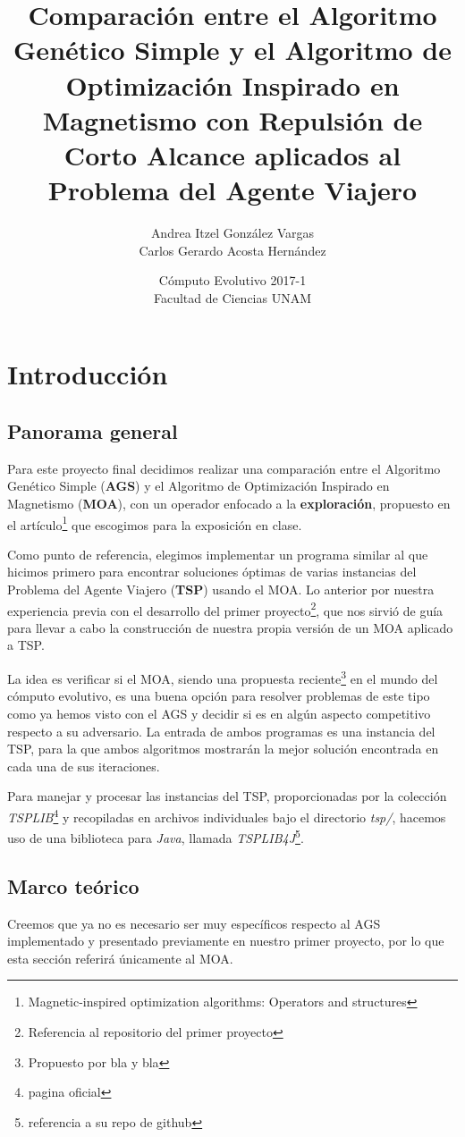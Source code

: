 \documentclass[12pt]{article}
\title{Comparación entre el Algoritmo Genético Simple y el Algoritmo de Optimización Inspirado en Magnetismo con Repulsión de Corto Alcance aplicados al Problema del Agente Viajero}
\author{Andrea Itzel González Vargas \\
  Carlos Gerardo Acosta Hernández}
\date{Cómputo Evolutivo 2017-1 \\ Facultad de Ciencias UNAM \\ }
\begin{document}
\maketitle
\section{Introducción}
\subsection*{Panorama general}
Para este proyecto final decidimos realizar una comparación entre el Algoritmo Genético Simple (\textbf{AGS}) y el Algoritmo de Optimización Inspirado en Magnetismo (\textbf{MOA}),
con un operador enfocado a la \textbf{exploración}, propuesto en el artículo\footnote{Magnetic-inspired optimization algorithms: Operators and structures} que escogimos para la exposición en clase.

Como punto de referencia, elegimos implementar un programa similar al que hicimos primero para encontrar soluciones óptimas de
varias instancias del Problema del Agente Viajero (\textbf{TSP}) usando el MOA. Lo anterior por nuestra experiencia previa con el desarrollo del primer proyecto\footnote{Referencia al repositorio del primer proyecto}, que nos sirvió de guía para llevar a cabo la construcción de nuestra propia versión de un MOA aplicado a TSP.

La idea es verificar si el MOA, siendo una propuesta reciente\footnote{Propuesto por bla y bla} en el mundo del cómputo evolutivo, es una buena opción para resolver problemas de este tipo como ya hemos visto con el AGS y decidir si es en algún aspecto competitivo respecto a su adversario.
La entrada de ambos programas es una instancia del TSP, para la que ambos algoritmos mostrarán la mejor solución encontrada en cada una de sus iteraciones.

Para manejar y procesar las instancias del TSP, proporcionadas por la colección \textit{TSPLIB}\footnote{pagina oficial} y recopiladas en archivos individuales bajo el directorio \textit{tsp/}, hacemos uso de una
biblioteca para \textit{Java}, llamada \textit{TSPLIB4J}\footnote{referencia a su repo de github}.


\subsection*{Marco teórico}
Creemos que ya no es necesario ser muy específicos respecto al AGS implementado y presentado previamente en nuestro primer proyecto, por lo que esta
sección referirá únicamente al MOA.\\
\end{document}
